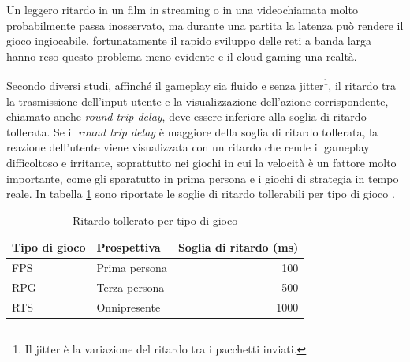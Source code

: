 Un leggero ritardo in un film in streaming o in una videochiamata molto probabilmente passa inosservato, ma durante una partita la latenza può rendere il gioco ingiocabile, fortunatamente il rapido sviluppo delle reti a banda larga hanno reso questo problema meno evidente e il cloud gaming una realtà.

Secondo diversi studi, affinché il gameplay sia fluido e senza jitter\footnote{Il jitter è la variazione del ritardo tra i pacchetti inviati.}, il ritardo tra la trasmissione dell'input utente e la visualizzazione dell'azione corrispondente, chiamato anche \textit{round trip delay}, deve essere inferiore alla soglia di ritardo tollerata. Se il \textit{round trip delay} è maggiore della soglia di ritardo tollerata, la reazione dell'utente viene visualizzata con un ritardo che rende il gameplay difficoltoso e irritante, soprattutto nei giochi in cui la velocità è un fattore molto importante, come gli sparatutto in prima persona e i giochi di strategia in tempo reale. In tabella \ref{table:Ritardo_tollerato_per_tipo_di_gioco} sono riportate le soglie di ritardo tollerabili per tipo di gioco \parencite{Cloud_Gaming_Architecture_and_Performance}.

\begin{table}[H]
	\centering
	\begin{tabular}{||l l r||}
		\hline
		Tipo di gioco & Prospettiva & Soglia di ritardo (ms) \\
		\hline\hline
		FPS & Prima persona & 100 \\
		\hline
		RPG & Terza persona & 500 \\
		\hline
		RTS & Onnipresente & 1000 \\
		\hline
	\end{tabular}

	\caption{Ritardo tollerato per tipo di gioco}
	\label{table:Ritardo_tollerato_per_tipo_di_gioco}
\end{table}



